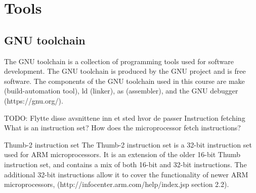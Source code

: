 \section{Tools}

\subsection{GNU toolchain}
The GNU toolchain is a collection of programming tools used for software development. The GNU toolchain is produced by the GNU project and is free software. The components of the GNU toolchain used in this course are make (build-automation tool), ld (linker), as (assembler), and the GNU debugger (https://gnu.org/).

TODO: Flytte disse avsnittene inn et sted hvor de passer
Instruction fetching
What is an instruction set? How does the microprocessor fetch instructions?

Thumb-2 instruction set
The Thumb-2 instruction set is a 32-bit instruction set used for ARM microprocessors. It is an extension of the older 16-bit Thumb instruction set, and contains a mix of both 16-bit and 32-bit instructions. The additional 32-bit instructions allow it to cover the functionality of newer ARM microprocessors, (http://infocenter.arm.com/help/index.jsp section 2.2).
